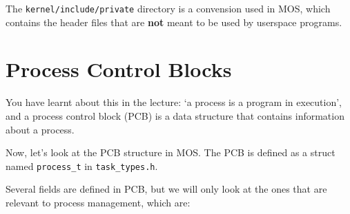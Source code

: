 \begin{note}
    \item The \texttt{kernel/include/private} directory is a convension used in MOS, which
    contains the header files that are \textbf{not} meant to be used by userspace programs.
\end{note}

\section{Process Control Blocks}

You have learnt about this in the lecture: `a process is a program in execution', and a process
control block (PCB) is a data structure that contains information about a process.

Now, let's look at the PCB structure in MOS. The PCB is defined as a struct named \texttt{process\_t}
in \texttt{task\_types.h}.

Several fields are defined in PCB, but we will only look at the ones that are relevant to
process management, which are:

